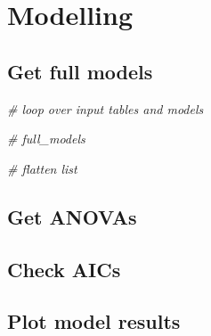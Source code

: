 \documentclass[
]{article}
\newenvironment{Shaded}{\begin{snugshade}}{\end{snugshade}}
\newcommand{\CommentTok}[1]{\textcolor[rgb]{0.56,0.35,0.01}{\textit{#1}}}
\begin{document}
\hypertarget{modelling}{%
\section{Modelling}\label{modelling}}

\hypertarget{get-full-models}{%
\subsection{Get full models}\label{get-full-models}}

\begin{Shaded}
\begin{Highlighting}[]
\CommentTok{\# loop over input tables and models}

\CommentTok{\# full\_models}



\CommentTok{\# flatten list}
\end{Highlighting}
\end{Shaded}

\hypertarget{get-anovas}{%
\subsection{Get ANOVAs}\label{get-anovas}}

\hypertarget{check-aics}{%
\subsection{Check AICs}\label{check-aics}}

\hypertarget{plot-model-results}{%
\subsection{Plot model results}\label{plot-model-results}}
\end{document}
